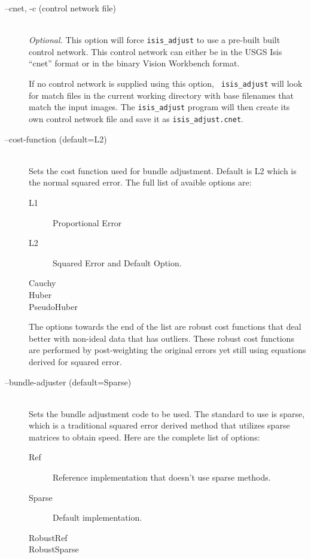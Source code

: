 \begin{description}

\item[--cnet, -c \textnormal{\small{(control network file)}}] \hfill \\
  \emph{Optional.} This option will force {\tt isis\_adjust} to
  use a pre-built built control network. This control network can
  either be in the USGS Isis ``cnet'' format or in the binary Vision
  Workbench format.

  If no control network is supplied using this option, {\tt
    isis\_adjust} will look for match files in the current working
  directory with base filenames that match the input images.  The
  \texttt{isis\_adjust} program will then create its own control
  network file and save it as \texttt{isis\_adjust.cnet}.

\item[--cost-function \textnormal{\small{(default=L2)}}] \hfill \\

  Sets the cost function used for bundle adjustment. Default is L2
  which is the normal squared error. The full list of avaible options
  are:

  \begin{description}
    \item[L1] Proportional Error
    \item[L2] Squared Error and Default Option.
    \item[Cauchy]
    \item[Huber]
    \item[PseudoHuber]
  \end{description}

  The options towards the end of the list are robust cost functions
  that deal better with non-ideal data that has outliers. These robust
  cost functions are performed by post-weighting the original errors yet
  still using equations derived for squared error.

\item[--bundle-adjuster \textnormal{\small{(default=Sparse)}}] \hfill \\

  Sets the bundle adjustment code to be used. The standard to use is
  sparse, which is a traditional squared error derived method that
  utilizes sparse matrices to obtain speed. Here are the complete list
  of options:

  \begin{description}
    \item[Ref] Reference implementation that doesn't use sparse methods.
    \item[Sparse] Default implementation.
    \item[RobustRef]
    \item[RobustSparse]
  \end{description}


\end{description}
